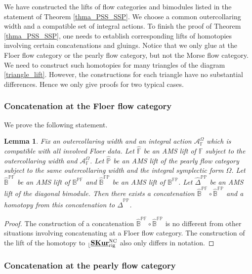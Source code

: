 \documentclass[reqno, 10pt]{amsart}
\numberwithin{equation}{section}
\numberwithin{equation}{section}
\newtheorem{lemma}[thm]{Lemma}
\theoremstyle{definition}
\theoremstyle{remark}
\newcommand{\mb}{\mathbb}
\newcommand{\mc}{\mathcal}
\renewcommand{\outer}{{}_{\lfloor}}
\newcommand{\uds}[1]{\underline{\smash{#1}}}
\begin{document}
We have constructed the lifts of flow categories and bimodules listed in the statement of Theorem \ref{thma_PSS_SSP}. We choose a common outercollaring width and a compatible set of integral actions. To finish the proof of Theorem \ref{thma_PSS_SSP}, one needs to establish corresponding lifts of homotopies involving certain concatenations and gluings. Notice that we only glue at the Floer flow category or the pearly flow category, but not the Morse flow category. We need to construct such homotopies for many triangles of the diagram \eqref{triangle_lift}. However, the constructions for each triangle have no substantial differences. Hence we only give proofs for two typical cases.

\subsubsection{Concatenation at the Floer flow category}

We prove the following statement.

\begin{lemma}
Fix an outercollaring width and an integral action ${\mc A}_{\mb F}^\Omega$ which is compatible with all involved Floer data. Let $\hat {\mb F}$ be an AMS lift of ${\mb F}$ subject to the outercollaring width and ${\mc A}_{\mb F}^\Omega$. Let $\hat {\mb P}$ be an AMS lift of the pearly flow category subject to the same outercollaring width and the integral symplectic form $\Omega$. Let $\hat {\mb B}^{\mb{PF}}$ be an AMS lift of ${\mb B}^{\mb{PF}}$ and $\hat {\mb B}^{\mb{FP}}$ be an AMS lift of $\mb{B}^{\mb{FP}}$. Let $\hat{\mb{\Delta}}^{\mb{PP}}$ be an AMS lift of the diagonal bimodule. Then there exists a concatenation $\hat {\mb B}^{\mb{PF}} \circ \hat {\mb B}^{\mb{FP}}$ and a homotopy from this concatenation to $\hat{\mb\Delta}^{\mb{PP}}$.
\end{lemma}

\begin{proof}
The construction of a concatenation $\hat{\mb B}^{\mb{PF}} \circ \hat{\mb B}^{\mb{FP}}$ is no different from other situations involving concatenating at a Floer flow category. The construction of the lift of the homotopy to $\outer \uds{\bf SKur}_{\rm rig}^{\rm NC}$ also only differs in notation. 
\end{proof}


\subsubsection{Concatenation at the pearly flow category}
\end{document}
